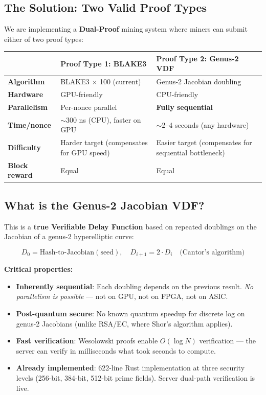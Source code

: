 \documentclass[11pt,a4paper]{article}
\begin{document}
\subsection{The Solution: Two Valid Proof Types}

We are implementing a \textbf{Dual-Proof} mining system where miners can submit either of two proof types:

\begin{center}
\begin{tabular}{@{}p{2.5cm}p{5.5cm}p{5.5cm}@{}}
\toprule
 & \textbf{Proof Type 1: BLAKE3} & \textbf{Proof Type 2: Genus-2 VDF} \\
\midrule
\textbf{Algorithm} & BLAKE3 $\times$ 100 (current) & Genus-2 Jacobian doubling \\
\textbf{Hardware} & GPU-friendly & CPU-friendly \\
\textbf{Parallelism} & Per-nonce parallel & \textbf{Fully sequential} \\
\textbf{Time/nonce} & $\sim$300 ns (CPU), faster on GPU & $\sim$2--4 seconds (any hardware) \\
\textbf{Difficulty} & Harder target (compensates for GPU speed) & Easier target (compensates for sequential bottleneck) \\
\textbf{Block reward} & Equal & Equal \\
\bottomrule
\end{tabular}
\end{center}

\subsection{What is the Genus-2 Jacobian VDF?}

This is a \textbf{true Verifiable Delay Function} based on repeated doublings on the Jacobian of a genus-2 hyperelliptic curve:

\begin{equation}
D_0 = \text{Hash-to-Jacobian}(\text{seed}), \quad D_{i+1} = 2 \cdot D_i \quad \text{(Cantor's algorithm)}
\end{equation}

\textbf{Critical properties:}
\begin{itemize}[leftmargin=1.5em]
    \item \textbf{Inherently sequential}: Each doubling depends on the previous result. \textit{No parallelism is possible} --- not on GPU, not on FPGA, not on ASIC.
    \item \textbf{Post-quantum secure}: No known quantum speedup for discrete log on genus-2 Jacobians (unlike RSA/EC, where Shor's algorithm applies).
    \item \textbf{Fast verification}: Wesolowski proofs enable $O(\log N)$ verification --- the server can verify in milliseconds what took seconds to compute.
    \item \textbf{Already implemented}: 622-line Rust implementation at three security levels (256-bit, 384-bit, 512-bit prime fields). Server dual-path verification is live.
\end{itemize}
\end{document}
